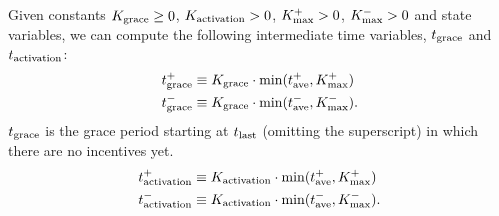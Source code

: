 Given constants $K_\textnormal{grace} \geq 0$,
$K_\textnormal{activation} > 0$, $K^+_\textnormal{max}>0$, $K^-_\textnormal{max}>0$ and state variables, we can compute the following intermediate time variables, $t_\textnormal{grace}$ and $t_\textnormal{activation}$:
\begin{align}
t^+_\textnormal{grace} &\equiv
 K_\textnormal{grace} \cdot \min(t^+_\textnormal{ave}, K^+_\textnormal{max})\\
t^-_\textnormal{grace} &\equiv K_\textnormal{grace} \cdot \min(t^-_\textnormal{ave}, K^-_\textnormal{max}).
\end{align}
$t_\textnormal{grace}$ is the grace period starting at $t_\textnormal{last}$ (omitting the superscript) in which there are no incentives yet.
\begin{align}
t^+_\textnormal{activation} &\equiv
 K_\textnormal{activation} \cdot \min(t^+_\textnormal{ave}, K^+_\textnormal{max})\\
t^-_\textnormal{activation} &\equiv
 K_\textnormal{activation} \cdot \min(t^-_\textnormal{ave}, K^-_\textnormal{max}).
\end{align}

